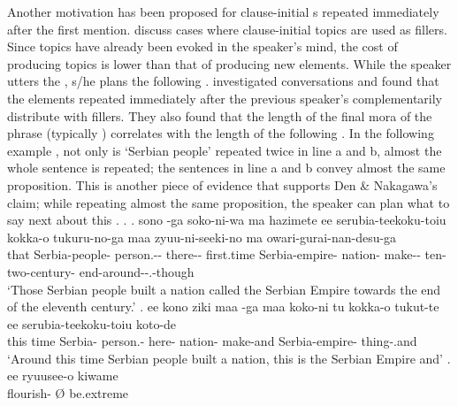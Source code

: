 Another motivation has been proposed for clause-initial s repeated immediately after the first mention.
 discuss cases where clause-initial topics are used as fillers.
Since topics have already been evoked in the speaker's mind, the cost of producing topics is lower than that of producing new elements.
While the speaker utters the ,
s/he plans the following .
 investigated conversations and found that the  elements repeated immediately after the previous speaker's 
complementarily distribute with fillers.
They also found that the length of the final mora of the  phrase (typically ) correlates with the length of the following 
\cite[see also][]{watanabeden10}.
In the following example \Next,
not only is `Serbian people' repeated twice in line a and b, almost the whole sentence is repeated;
the sentences in line a and b convey almost the same proposition.
This is another piece of evidence that supports Den \& Nakagawa's claim;
while repeating almost the same proposition,
the speaker can plan what to say next about this .
%
\largerpage
\ex.
 \ag. sono  -ga soko-ni-wa ma hazimete ee serubia-teekoku-toiu kokka-o tukuru-no-ga maa zyuu-ni-seeki-no ma owari-gurai-nan-desu-ga \\
 	that Serbia-people- person.-- there--  first.time  Serbia-empire- nation- make--  ten-two-century-  end-around--.-though \\
	`Those Serbian people built a nation called the Serbian Empire towards the end of the eleventh century.'
 \bg. ee kono ziki maa  -ga maa koko-ni tu kokka-o tukut-te ee serubia-teekoku-toiu koto-de \\
 	 this time  Serbia- person.-  here-  nation- make-and  Serbia-empire- thing-.and \\
	`Around this time Serbian people built a nation, this is the Serbian Empire and'
 \bg. ee ryuusee-o \EM{\O} kiwame \\
 		 flourish- {\O} be.extreme \\
